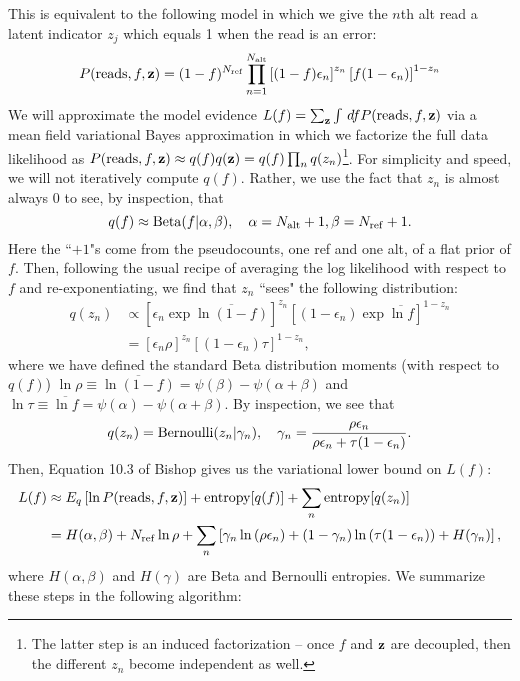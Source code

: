 \documentclass[nofootinbib,amssymb,amsmath]{revtex4}
\newcommand{\vz}{{\bf z}}
\begin{document}
This is equivalent to the following model in which we give the $n$th alt read a latent indicator $z_j$ which equals 1 when the read is an error:
\begin{align}
P({\rm reads}, f, \vz) = (1-f)^{N_{\rm ref}} \prod_{n=1}^{N_{\rm alt}} \left[ (1-f)\epsilon_n \right]^{z_n} \left[ f (1 - \epsilon_n) \right]^{1 - z_n}
\end{align}
We will approximate the model evidence $L(f) = \sum_\vz \int \, df P({\rm reads}, f, \vz)$ via a mean field variational Bayes approximation in which we factorize the full data likelihood as $P({\rm reads}, f, \vz) \approx q(f) q(\vz) = q(f) \prod_n q(z_n)$\footnote{The latter step is an induced factorization -- once $f$ and $\vz$ are decoupled, then the different $z_n$ become independent as well.}.  For simplicity and speed, we will not iteratively compute $q(f)$.  Rather, we use the fact that $z_n$ is almost always 0 to see, by inspection, that
\begin{equation}
q(f) \approx {\rm Beta}(f | \alpha, \beta), \quad \alpha = N_{\rm alt} + 1, \beta = N_{\rm ref} + 1.
\end{equation}
Here the ``$+1$"s come from the pseudocounts, one ref and one alt, of a flat prior of $f$.  Then, following the usual recipe of averaging the log likelihood with respect to $f$ and re-exponentiating, we find that $z_n$ ``sees" the following distribution:
\begin{align}
q(z_n) &\propto \left[ \epsilon_n \exp \overline{\ln (1 - f)} \right]^{z_n} \left[ (1 - \epsilon_n) \exp \overline{\ln f} \right]^{1 - z_n} \\
&= \left[ \epsilon_n \rho \right]^{z_n} \left[ (1 - \epsilon_n) \tau \right]^{1 - z_n},
\end{align}
where we have defined the standard Beta distribution moments (with respect to $q(f)$) $\ln \rho \equiv \overline{\ln (1 - f)} = \psi(\beta) - \psi(\alpha + \beta)$ and $\ln \tau \equiv \overline{\ln f} = \psi(\alpha) - \psi(\alpha + \beta)$. By inspection, we see that
\begin{equation}
q(z_n) = {\rm Bernoulli}(z_n | \gamma_n), \quad \gamma_n = \frac{ \rho \epsilon_n}{\rho \epsilon_n + \tau (1 - \epsilon_n)}.
\end{equation}
Then, Equation 10.3 of Bishop gives us the variational lower bound on $L(f)$:
\begin{align}
L(f) &\approx E_q \left[ \ln P({\rm reads}, f, \vz) \right] + {\rm entropy}[q(f)] + \sum_n {\rm entropy}[q(z_n)] \\
&= H(\alpha, \beta) +  N_{\rm ref} \ln \rho + \sum_n \left[ \gamma_n \ln \left( \rho \epsilon_n \right) + (1 - \gamma_n) \ln \left( \tau (1 - \epsilon_n) \right) + H(\gamma_n) \right],
\end{align}
where $H(\alpha, \beta)$ and $H(\gamma)$ are Beta and Bernoulli entropies.  We summarize these steps in the following algorithm:
\end{document}
